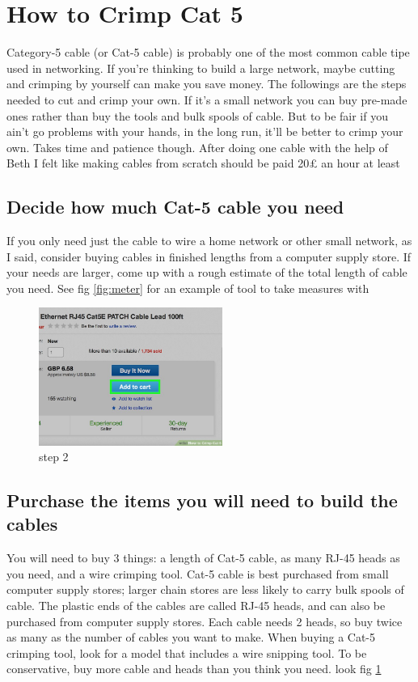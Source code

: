 \documentclass[a4paper,12pt]{book}
\begin{document}
\section{How to Crimp Cat 5}
Category-5 cable (or Cat-5 cable) is probably one of the most common cable tipe used in networking.
If you're thinking to build a large network, maybe cutting and crimping by yourself can make you save money. The followings are the steps needed to cut and crimp your own. If it's a small network you can buy pre-made ones rather than buy the tools and bulk spools of cable. But to be fair if you ain't go problems with your hands, in the long run, it'll be better to crimp your own. Takes time and patience though. After doing one cable with the help of Beth I felt like making cables from scratch should be paid 20£ an hour at least

\subsection{Decide how much Cat-5 cable you need}
If you only need just the cable to wire a home network or other small network, as I said, consider buying cables in finished lengths from a computer supply store. If your needs are larger, come up with a rough estimate of the total length of cable you need. See fig \ref{fig:meter} for an example of tool to take measures with

\clearpage

\begin{figure}
\centering
\includegraphics[width= 6cm]{./step2.JPG}
\caption{step 2}\label{fig:step2}
\end{figure}

\subsection{Purchase the items you will need to build the cables}
You will need to buy 3 things: a length of Cat-5 cable, as many RJ-45 heads as you need, and a wire crimping tool. Cat-5 cable is best purchased from small computer supply stores; larger chain stores are less likely to carry bulk spools of cable. The plastic ends of the cables are called RJ-45 heads, and can also be purchased from computer supply stores. Each cable needs 2 heads, so buy twice as many as the number of cables you want to make. When buying a Cat-5 crimping tool, look for a model that includes a wire snipping tool. To be conservative, buy more cable and heads than you think you need. look fig \ref{fig:step2}
\end{document}
